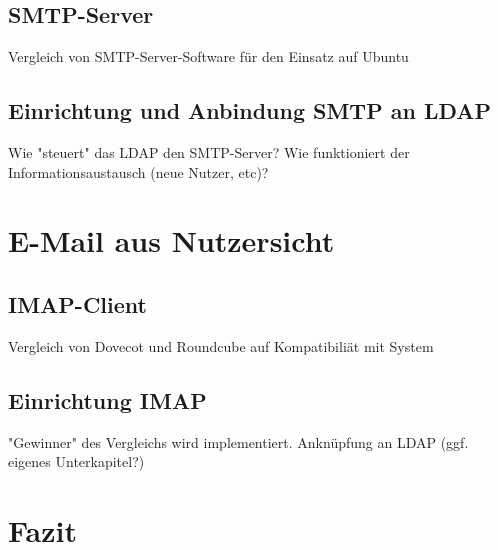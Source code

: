 \section{SMTP-Server}
Vergleich von SMTP-Server-Software für den Einsatz auf Ubuntu

\section{Einrichtung und Anbindung SMTP an LDAP}
Wie "steuert" das LDAP den SMTP-Server? Wie funktioniert der Informationsaustausch (neue Nutzer, etc)?

\chapter{E-Mail aus Nutzersicht}

\section{IMAP-Client}
Vergleich von Dovecot und Roundcube auf Kompatibiliät mit System

\section{Einrichtung IMAP}
"Gewinner" des Vergleichs wird implementiert.
Anknüpfung an LDAP (ggf. eigenes Unterkapitel?)


\chapter{Fazit}

\blindtext

